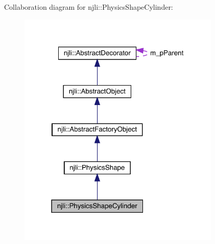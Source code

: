 Collaboration diagram for njli\+:\+:Physics\+Shape\+Cylinder\+:\nopagebreak
\begin{figure}[H]
\begin{center}
\leavevmode
\includegraphics[width=274pt]{classnjli_1_1_physics_shape_cylinder__coll__graph}
\end{center}
\end{figure}
